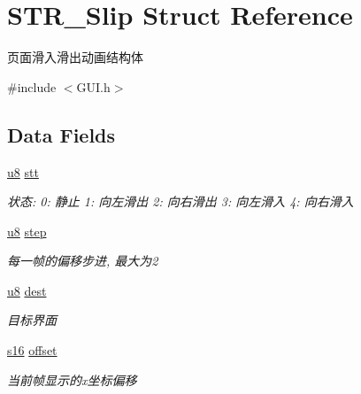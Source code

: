 \hypertarget{struct_s_t_r___slip}{\section{\-S\-T\-R\-\_\-\-Slip \-Struct \-Reference}
\label{struct_s_t_r___slip}
}


页面滑入滑出动画结构体  




{\ttfamily \#include $<$\-G\-U\-I.\-h$>$}

\subsection*{\-Data \-Fields}
\begin{DoxyCompactItemize}
\item 
\hypertarget{struct_s_t_r___slip_a80fabf8814bb01529f412455604bd324}{\hyperlink{group___b_s_p_gaed742c436da53c1080638ce6ef7d13de}{u8} \hyperlink{struct_s_t_r___slip_a80fabf8814bb01529f412455604bd324}{stt}}\label{struct_s_t_r___slip_a80fabf8814bb01529f412455604bd324}

\begin{DoxyCompactList}\small\item\em 状态\-: 0\-: 静止 1\-: 向左滑出 2\-: 向右滑出 3\-: 向左滑入 4\-: 向右滑入 \end{DoxyCompactList}\item 
\hypertarget{struct_s_t_r___slip_acef1777f39b5ac1699412f16b9f1f9ca}{\hyperlink{group___b_s_p_gaed742c436da53c1080638ce6ef7d13de}{u8} \hyperlink{struct_s_t_r___slip_acef1777f39b5ac1699412f16b9f1f9ca}{step}}\label{struct_s_t_r___slip_acef1777f39b5ac1699412f16b9f1f9ca}

\begin{DoxyCompactList}\small\item\em 每一帧的偏移步进, 最大为2 \end{DoxyCompactList}\item 
\hypertarget{struct_s_t_r___slip_ab05596059e02d148e2b86bf84bccc43b}{\hyperlink{group___b_s_p_gaed742c436da53c1080638ce6ef7d13de}{u8} \hyperlink{struct_s_t_r___slip_ab05596059e02d148e2b86bf84bccc43b}{dest}}\label{struct_s_t_r___slip_ab05596059e02d148e2b86bf84bccc43b}

\begin{DoxyCompactList}\small\item\em 目标界面 \end{DoxyCompactList}\item 
\hypertarget{struct_s_t_r___slip_a0d9e2e9984f21129b2b54a114600b57b}{\hyperlink{group___b_s_p_ga5ffa4f640862b25ba6d4f635b78bdbe1}{s16} \hyperlink{struct_s_t_r___slip_a0d9e2e9984f21129b2b54a114600b57b}{offset}}\label{struct_s_t_r___slip_a0d9e2e9984f21129b2b54a114600b57b}

\begin{DoxyCompactList}\small\item\em 当前帧显示的x坐标偏移 \end{DoxyCompactList}\end{DoxyCompactItemize}


